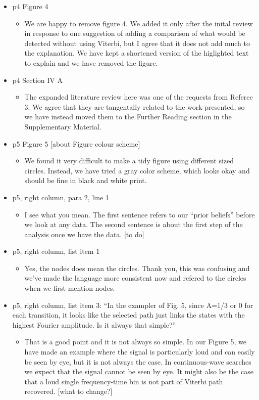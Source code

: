\documentclass[a4paper, 10pt]{letter}
\begin{document}
\begin{itemize}
\item p4 Figure 4 
\begin{itemize}
\item We are happy to remove figure 4. We added it only after the inital review in response to one suggestion of adding a comparison of what would be detected without using Viterbi, but I agree that it does not add much to the explanation. We have kept a shortened version of the higlighted text to explain and we have removed the figure. 
\end{itemize}

\item p4 Section IV A
\begin{itemize}
\item The expanded literature review here was one of the requests from Referee 3. We agree that they are tangentally related to the work presented, so we have instead moved them to the Further Reading section in the Supplementary Material. 
\end{itemize}

\item p5 Figure 5 [about Figure colour scheme]
\begin{itemize}
\item We found it very difficult to make a tidy figure using different sized circles. Instead, we have tried a gray color scheme, which looks okay and should be fine in black and white print. 
\end{itemize}

\item p5, right column, para 2, line 1
\begin{itemize}
\item I see what you mean. The first sentence refers to our ``prior beliefs'' before we look at any data. The second sentence is about the first step of the analysis once we have the data.  
[to do]
\end{itemize}

\item p5, right column, list item 1
\begin{itemize}
\item Yes, the nodes does mean the circles. Thank you, this was confusing and we've made the language more consistent now and refered to the circles when we first mention nodes.
\end{itemize}

\item p5, right column, list item 3: ``In the exampler of Fig. 5, since A=1/3 or 0 for each transition, it looks like the selected path just links the states with the highest Fourier amplitude. Is it always that simple?''
\begin{itemize}
\item That is a good point and it is not always so simple. In our Figure 5, we have made an example where the signal is particularly loud and can easily be seen by eye, but it is not always the case. In continuous-wave searches we expect that the signal cannot be seen by eye. It might also be the case that a loud single frequency-time bin is not part of Viterbi path recovered. [what to change?]
\end{itemize}


\end{itemize}
\end{document}
